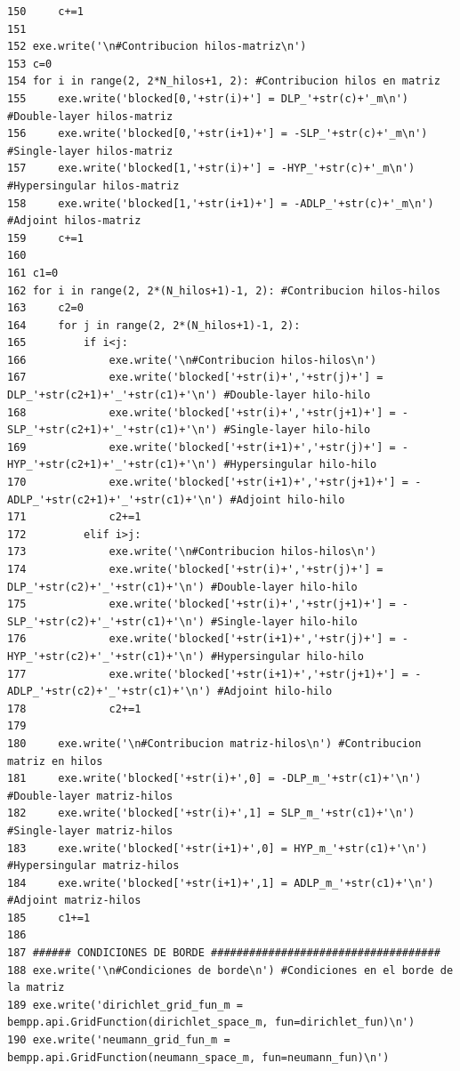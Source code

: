 \documentclass[12pt,letterpaper]{article}
\numberwithin{equation}{section}
\begin{document}
\begin{lstlisting}
150     c+=1
151 
152 exe.write('\n#Contribucion hilos-matriz\n')
153 c=0
154 for i in range(2, 2*N_hilos+1, 2): #Contribucion hilos en matriz
155     exe.write('blocked[0,'+str(i)+'] = DLP_'+str(c)+'_m\n') #Double-layer hilos-matriz 
156     exe.write('blocked[0,'+str(i+1)+'] = -SLP_'+str(c)+'_m\n') #Single-layer hilos-matriz
157     exe.write('blocked[1,'+str(i)+'] = -HYP_'+str(c)+'_m\n') #Hypersingular hilos-matriz
158     exe.write('blocked[1,'+str(i+1)+'] = -ADLP_'+str(c)+'_m\n') #Adjoint hilos-matriz
159     c+=1
160 
161 c1=0
162 for i in range(2, 2*(N_hilos+1)-1, 2): #Contribucion hilos-hilos
163     c2=0
164     for j in range(2, 2*(N_hilos+1)-1, 2):
165         if i<j:
166             exe.write('\n#Contribucion hilos-hilos\n')
167             exe.write('blocked['+str(i)+','+str(j)+'] = DLP_'+str(c2+1)+'_'+str(c1)+'\n') #Double-layer hilo-hilo
168             exe.write('blocked['+str(i)+','+str(j+1)+'] = -SLP_'+str(c2+1)+'_'+str(c1)+'\n') #Single-layer hilo-hilo
169             exe.write('blocked['+str(i+1)+','+str(j)+'] = -HYP_'+str(c2+1)+'_'+str(c1)+'\n') #Hypersingular hilo-hilo
170             exe.write('blocked['+str(i+1)+','+str(j+1)+'] = -ADLP_'+str(c2+1)+'_'+str(c1)+'\n') #Adjoint hilo-hilo
171             c2+=1
172         elif i>j:
173             exe.write('\n#Contribucion hilos-hilos\n')
174             exe.write('blocked['+str(i)+','+str(j)+'] = DLP_'+str(c2)+'_'+str(c1)+'\n') #Double-layer hilo-hilo
175             exe.write('blocked['+str(i)+','+str(j+1)+'] = -SLP_'+str(c2)+'_'+str(c1)+'\n') #Single-layer hilo-hilo
176             exe.write('blocked['+str(i+1)+','+str(j)+'] = -HYP_'+str(c2)+'_'+str(c1)+'\n') #Hypersingular hilo-hilo
177             exe.write('blocked['+str(i+1)+','+str(j+1)+'] = -ADLP_'+str(c2)+'_'+str(c1)+'\n') #Adjoint hilo-hilo
178             c2+=1
179 
180     exe.write('\n#Contribucion matriz-hilos\n') #Contribucion matriz en hilos
181     exe.write('blocked['+str(i)+',0] = -DLP_m_'+str(c1)+'\n') #Double-layer matriz-hilos
182     exe.write('blocked['+str(i)+',1] = SLP_m_'+str(c1)+'\n') #Single-layer matriz-hilos
183     exe.write('blocked['+str(i+1)+',0] = HYP_m_'+str(c1)+'\n') #Hypersingular matriz-hilos 
184     exe.write('blocked['+str(i+1)+',1] = ADLP_m_'+str(c1)+'\n') #Adjoint matriz-hilos
185     c1+=1
186 
187 ###### CONDICIONES DE BORDE ####################################
188 exe.write('\n#Condiciones de borde\n') #Condiciones en el borde de la matriz
189 exe.write('dirichlet_grid_fun_m = bempp.api.GridFunction(dirichlet_space_m, fun=dirichlet_fun)\n')
190 exe.write('neumann_grid_fun_m = bempp.api.GridFunction(neumann_space_m, fun=neumann_fun)\n')

\end{lstlisting}
\end{document}
